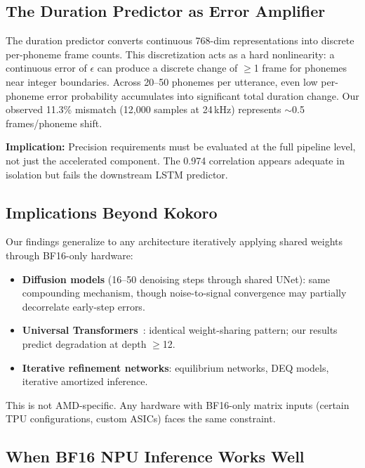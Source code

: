 \documentclass[11pt]{article}
\begin{document}
\subsection{The Duration Predictor as Error Amplifier}

The duration predictor converts continuous 768-dim representations into discrete per-phoneme frame counts. This discretization acts as a hard nonlinearity: a continuous error of $\epsilon$ can produce a discrete change of $\geq$1 frame for phonemes near integer boundaries. Across 20--50 phonemes per utterance, even low per-phoneme error probability accumulates into significant total duration change. Our observed 11.3\% mismatch (12,000 samples at 24\,kHz) represents ${\sim}$0.5 frames/phoneme shift.

\textbf{Implication:} Precision requirements must be evaluated at the full pipeline level, not just the accelerated component. The 0.974 correlation appears adequate in isolation but fails the downstream LSTM predictor.

\subsection{Implications Beyond Kokoro}

Our findings generalize to any architecture iteratively applying shared weights through BF16-only hardware:

\begin{itemize}[nosep]
    \item \textbf{Diffusion models} (16--50 denoising steps through shared UNet): same compounding mechanism, though noise-to-signal convergence may partially decorrelate early-step errors.
    \item \textbf{Universal Transformers}~\citep{dehghani2019universal}: identical weight-sharing pattern; our results predict degradation at depth $\geq$12.
    \item \textbf{Iterative refinement networks}: equilibrium networks, DEQ models, iterative amortized inference.
\end{itemize}

This is not AMD-specific. Any hardware with BF16-only matrix inputs (certain TPU configurations, custom ASICs) faces the same constraint.

\subsection{When BF16 NPU Inference Works Well}
\end{document}
